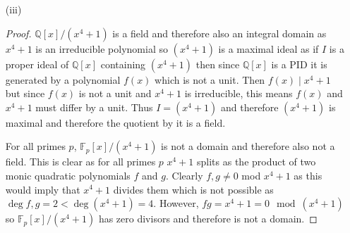 \documentclass[12pt]{article}
\begin{document}
\begin{enumerate}
\begin{proof}
        Now if $-1$ or $2$ are quadratic residues modulo $p$ we are done, else
        $-1 \cdot 2 = -2$ is a quadratic residue modulo $p$.

        Now to show that $x^4 + 1$ is reducible. Case 1, $\exists a \in \mathbb F_p$
        such that $a^2 = -1$ mod p then
        \[ (x^2 + a)(x^2 + a^{-1}) = x^4 + (a + a^{-1})x^2 + 1 = x^4 + a^{-1}(a^2 + 1)x^2 + 1 = x^4 + 1 \]
        and both factors are monic of positive degree so this is a non-trivial factorization of $x^4 + 1$.
        Otherwise, if $\exists a \in \mathbb F_p$ such that $a^2 = -2$ mod p, then
        \[ (x^2 + ax - 1)(x^2 - ax -1) = x^4 + (a - a)x^3 + (-1 - 1 - a^2)x^2 + (-a + a)x + 1 = x^4 + 1 \]
        and clearly this is a non-trivial factorization.
        Finally, if $\exists a \in \mathbb F_p$ such that $a^2 = 2$ mod p then
        \[ (x^2 + ax + 1)(x^2 - ax + 1) = x^4 + (a - a)x^3 + (1 + 1 - a^2)x^2 + (a - a)x + 1 = x^4 + 1 \]
        and this is clearly a non-trivial factorization.

        Thus $x^4 + 1$ is reducible mod p for any $p$.
    \end{proof}

    \item[(iii)]
    \begin{proof}
        $\mathbb Q[x]/(x^4 + 1)$ is a field and therefore also an integral domain as $x^4 + 1$ is an irreducible polynomial
        so $(x^4 + 1)$ is a maximal ideal as if $I$ is a proper ideal of $\mathbb Q[x]$
        containing $(x^4 + 1)$ then since $\mathbb Q[x]$ is a PID it is generated by a polynomial $f(x)$ which is not a unit.
        Then $f(x) \mid x^4 + 1$ but since $f(x)$ is not a unit and $x^4 + 1$ is irreducible,
        this means $f(x)$ and $x^4 + 1$ must differ by a unit. Thus $I = (x^4 + 1)$
        and therefore $(x^4 + 1)$ is maximal and therefore the quotient by it is a field.

        For all primes $p$, $\mathbb F_p[x]/(x^4 + 1)$ is not a domain and therefore also not a field. This is clear as
        for all primes $p$ $x^4 + 1$ splits as the product of two monic quadratic polynomials
        $f$ and $g$. Clearly $f, g \neq 0$ mod $x^4 + 1$ as this would imply that
        $x^4 + 1$ divides them which is not possible as $\deg f, g = 2 < \deg (x^4 + 1) = 4$.
        However, $fg = x^4 + 1 = 0 \mod (x^4 + 1)$ so $\mathbb F_p[x]/(x^4 + 1)$
        has zero divisors and therefore is not a domain.
    \end{proof}
\end{enumerate}
\end{document}
